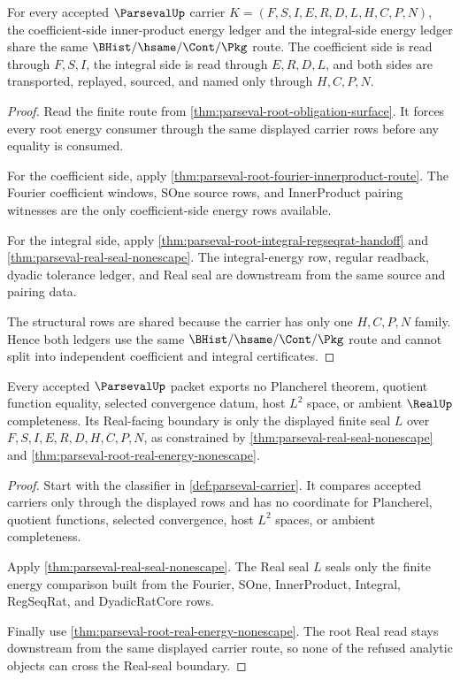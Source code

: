 \begin{theorem}
\label{thm:parseval-innerproduct-energy-ledger}
For every accepted $\ParsevalUp$ carrier $K=(F,S,I,E,R,D,L,H,C,P,N)$, the coefficient-side inner-product energy ledger and the integral-side energy ledger share the same $\BHist/\hsame/\Cont/\Pkg$ route. The coefficient side is read through $F,S,I$, the integral side is read through $E,R,D,L$, and both sides are transported, replayed, sourced, and named only through $H,C,P,N$.
\end{theorem}
\begin{proof}
Read the finite route from \autoref{thm:parseval-root-obligation-surface}. It forces every root energy consumer through the same displayed carrier rows before any equality is consumed.

For the coefficient side, apply \autoref{thm:parseval-root-fourier-innerproduct-route}. The Fourier coefficient windows, SOne source rows, and InnerProduct pairing witnesses are the only coefficient-side energy rows available.

For the integral side, apply \autoref{thm:parseval-root-integral-regseqrat-handoff} and \autoref{thm:parseval-real-seal-nonescape}. The integral-energy row, regular readback, dyadic tolerance ledger, and Real seal are downstream from the same source and pairing data.

The structural rows are shared because the carrier has only one $H,C,P,N$ family. Hence both ledgers use the same $\BHist/\hsame/\Cont/\Pkg$ route and cannot split into independent coefficient and integral certificates.
\end{proof}

\begin{theorem}
\label{thm:parseval-real-seal-refusal-boundary}
Every accepted $\ParsevalUp$ packet exports no Plancherel theorem, quotient function equality, selected convergence datum, host $L^2$ space, or ambient $\RealUp$ completeness. Its Real-facing boundary is only the displayed finite seal $L$ over $F,S,I,E,R,D,H,C,P,N$, as constrained by \autoref{thm:parseval-real-seal-nonescape} and \autoref{thm:parseval-root-real-energy-nonescape}.
\end{theorem}
\begin{proof}
Start with the classifier in \autoref{def:parseval-carrier}. It compares accepted carriers only through the displayed rows and has no coordinate for Plancherel, quotient functions, selected convergence, host $L^2$ spaces, or ambient completeness.

Apply \autoref{thm:parseval-real-seal-nonescape}. The Real seal $L$ seals only the finite energy comparison built from the Fourier, SOne, InnerProduct, Integral, RegSeqRat, and DyadicRatCore rows.

Finally use \autoref{thm:parseval-root-real-energy-nonescape}. The root Real read stays downstream from the same displayed carrier route, so none of the refused analytic objects can cross the Real-seal boundary.
\end{proof}

